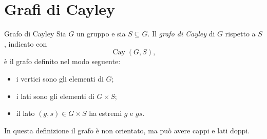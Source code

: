 \documentclass[a4paper]{article}
\begin{document}
\section{Grafi di Cayley}

\begin{snippetdefinition}{Grafo di Cayley}
    Sia \(G\) un gruppo e sia \(S\subseteq G\). Il \emph{grafo di Cayley} di \(G\) rispetto a \(S\), indicato con
    \[
        \operatorname{Cay}(G,S),
    \]
    è il grafo definito nel modo seguente:
    \begin{itemize}
        \item i vertici sono gli elementi di \(G\);
        \item i lati sono gli elementi di \(G\times S\);
        \item il lato \((g,s)\in G\times S\) ha estremi \(g\) e \(gs\).
    \end{itemize}

    In questa definizione il grafo è non orientato, ma può avere cappi e lati doppi.
\end{snippetdefinition}
\end{document}
